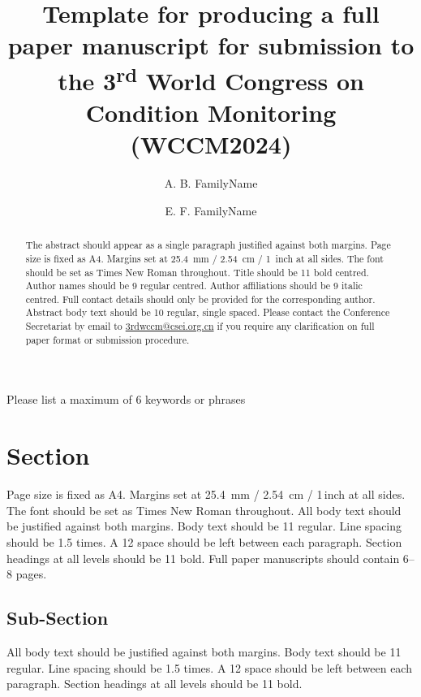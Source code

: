 \documentclass[a4paper,11pt]{article}
\title {Template for producing a full paper manuscript for submission to the
  3\textsuperscript{rd} World Congress on Condition Monitoring (WCCM2024)}
\author[1]{A. B. FamilyName}
\author[2]{E. F. FamilyName}
\affil[1]{Department, University/Company Name.}
\affil[2]{Department, University/Company Name.}
\begin{document}
\maketitle

\begin{abstract}
The abstract should appear as a single paragraph justified against both
margins. Page size is fixed as A4. Margins set at \qty{25.4}{\milli\meter} /
\qty{2.54}{\centi\meter} / \num{1}~inch at all sides. The font should be set as
Times New Roman throughout. Title should be \qty{11}{\point} bold centred.
Author names should be \qty{9}{\point} regular centred. Author affiliations
should be \qty{9}{\point} italic centred. Full contact details should only be
provided for the corresponding author. Abstract body text should be
\qty{10}{\point} regular, single spaced. Please contact the Conference
Secretariat by email to \href{mailto:3rdwccm@csei.org.cn}{3rdwccm@csei.org.cn}
if you require any clarification on full paper format or submission procedure.
\end{abstract}

\begin{keywords}
Please list a maximum of \num{6} keywords or phrases
\end{keywords}

\section{Section}

Page size is fixed as A4. Margins set at \qty{25.4}{\milli\meter} /
\qty{2.54}{\centi\meter} / \num{1}\,inch at all sides. The font should be set
as Times New Roman throughout. All body text should be justified against both
margins. Body text should be \qty{11}{\point} regular.
Line spacing should be \num{1.5} times. A \qty{12}{\point} space should be left
between each paragraph. Section headings at all levels should be
\qty{11}{\point} bold. Full paper manuscripts should contain
\numrange[range-phrase = --]{6}{8} pages.

\subsection{Sub-Section}

All body text should be justified against both margins. Body text should be
\qty{11}{\point} regular. Line spacing should be \num{1.5} times. A
\qty{12}{\point} space should be left between each paragraph. Section headings
at all levels should be \qty{11}{\point} bold.
\end{document}

